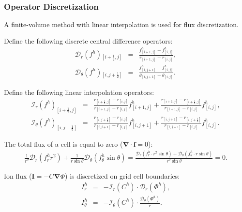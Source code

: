 \documentclass[final]{elsarticle}
\newcommand{\pars}[1]{\left(#1\right)}
\newcommand{\half}{\frac{1}{2}}
\newcommand\bnabla{\boldsymbol{\nabla}}
\newcommand\bI{\boldsymbol{I}}
\newcommand\cI{\mathcal{I}}
\newcommand\cD{\mathcal{D}}
\begin{document}
\subsubsection{Operator Discretization}
A finite-volume method with linear interpolation is used for flux discretization. 

Define the following discrete central difference operators:
\begin{eqnarray*}
\cD_r(f^h){}_{\left[i+\half,j\right]} &=& \frac{f^h_{\left[i+1,j\right]} - f^h_{\left[i,j\right]}}
                       {r_{\left[i+1,j\right]} - r_{\left[i,j\right]}}, \\
\cD_\theta(f^h){}_{\left[i,j+\half\right]} &=& \frac{f^h_{\left[i,j+1\right]} - f^h_{\left[i,j\right]}}
					   {\theta_{\left[i,j+1\right]} - \theta_{\left[i,j\right]}}.
\end{eqnarray*}

Define the following linear interpolation operators:
\begin{eqnarray*}
\cI_r(f^h)_{\left[i+\half,j\right]} &=& 
\frac{r_{\left[i+\half,j\right]} - r_{\left[i,j\right]}}
{r_{\left[i+1,j\right]} - r_{\left[i,j\right]}} 
f^h_{\left[i+1,j\right]} 
+ 
\frac{r_{\left[i+1,j\right]} - r_{\left[i+\half,j\right]}}
{r_{\left[i+1,j\right]} - r_{\left[i,j\right]}}
f^h_{\left[i,j\right]},
\\
\cI_\theta(f^h)_{\left[i,j+\half\right]} &=& 
\frac{r_{\left[i,j+\half\right]} - r_{\left[i,j\right]}}
{r_{\left[i,j+1\right]} - r_{\left[i,j\right]}}
  f^h_{\left[i,j+1\right]} + 
\frac{ r_{\left[i,j+1\right]} - r_{\left[i,j+\half\right]}}
{r_{\left[i,j+1\right]} - r_{\left[i,j\right]}}
  f^h_{\left[i,j\right]}.
\end{eqnarray*}

The total flux of a cell is equal to zero ($\bnabla \cdot \boldsymbol{f} = 0$):
\begin{eqnarray*}
\frac{1}{r^2} \cD_r\pars{f^h_r r^2} + 
\frac{1}{r \sin\theta} \cD_\theta\pars{f^h_\theta \sin\theta} =
\frac{\cD_r\pars{f^h_r \cdot r^2 \sin\theta} + 
\cD_\theta\pars{f^h_\theta \cdot r \sin\theta}}{r^2 \sin\theta} = 0. 
\end{eqnarray*}

Ion flux ($\bI = - C \bnabla \varPhi$) is discretized on grid cell boundaries:
\begin{eqnarray*}
I^h_r &=& -\cI_r(C^h) \cdot \cD_r(\varPhi^h), \\
I^h_\theta &=& -\cI_\theta(C^h) \cdot \frac{\cD_\theta(\varPhi^h)}{r}.
\end{eqnarray*}
\end{document}
